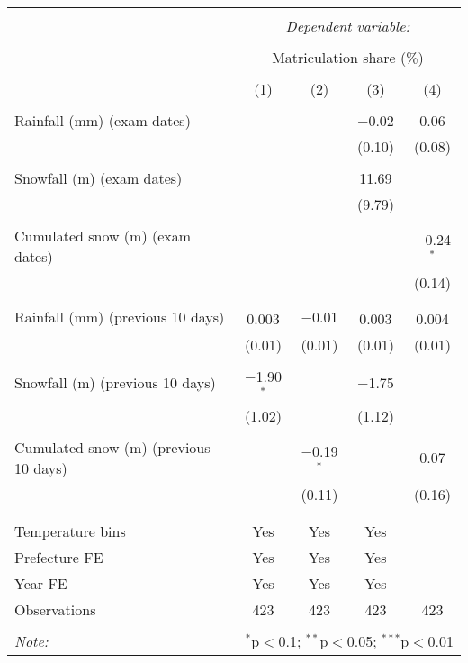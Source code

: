 
\begin{tabular}{@{\extracolsep{5pt}}lcccc} 
\\[-1.8ex]\hline 
\hline \\[-1.8ex] 
 & \multicolumn{4}{c}{\textit{Dependent variable:}} \\ 
\cline{2-5} 
\\[-1.8ex] & \multicolumn{4}{c}{Matriculation share (\%)} \\ 
\\[-1.8ex] & (1) & (2) & (3) & (4)\\ 
\hline \\[-1.8ex] 
 Rainfall (mm) (exam dates) &  &  & $-$0.02 & 0.06 \\ 
  &  &  & (0.10) & (0.08) \\ 
  & & & & \\ 
 Snowfall (m) (exam dates) &  &  & 11.69 &  \\ 
  &  &  & (9.79) &  \\ 
  & & & & \\ 
 Cumulated snow (m) (exam dates) &  &  &  & $-$0.24$^{*}$ \\ 
  &  &  &  & (0.14) \\ 
  & & & & \\ 
 Rainfall (mm) (previous 10 days) & $-$0.003 & $-$0.01 & $-$0.003 & $-$0.004 \\ 
  & (0.01) & (0.01) & (0.01) & (0.01) \\ 
  & & & & \\ 
 Snowfall (m) (previous 10 days) & $-$1.90$^{*}$ &  & $-$1.75 &  \\ 
  & (1.02) &  & (1.12) &  \\ 
  & & & & \\ 
 Cumulated snow (m) (previous 10 days) &  & $-$0.19$^{*}$ &  & 0.07 \\ 
  &  & (0.11) &  & (0.16) \\ 
  & & & & \\ 
\hline \\[-1.8ex] 
Temperature bins & Yes & Yes & Yes &  \\ 
Prefecture FE & Yes & Yes & Yes &  \\ 
Year FE & Yes & Yes & Yes &  \\ 
Observations & 423 & 423 & 423 & 423 \\ 
\hline 
\hline \\[-1.8ex] 
\textit{Note:}  & \multicolumn{4}{r}{$^{*}$p$<$0.1; $^{**}$p$<$0.05; $^{***}$p$<$0.01} \\ 
\end{tabular} 
